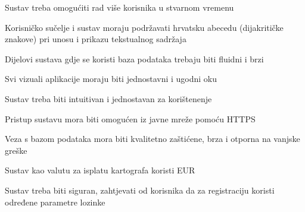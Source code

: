			 \begin{packed_item}
			 	\item Sustav treba omogućiti rad više korisnika u stvarnom vremenu
			 	\item Korisničko sučelje i sustav moraju podržavati hrvatsku abecedu (dijakritičke znakove) pri unosu i prikazu tekstualnog sadržaja
			 	\item Dijelovi sustava gdje se koristi baza podataka trebaju biti fluidni i brzi
			 	\item Svi vizuali aplikacije moraju biti jednostavni i ugodni oku
			 	\item Sustav treba biti intuitivan i jednostavan za korištenenje
			 	\item Pristup sustavu mora biti omogućen iz javne mreže pomoću HTTPS
			 	\item Veza s bazom podataka mora biti kvalitetno zaštićene, brza i otporna na vanjske greške
			 	\item Sustav kao valutu za isplatu kartografa koristi EUR
			 	\item Sustav treba biti siguran, zahtjevati od korisnika da za registraciju koristi određene parametre lozinke
			 	
			 \end{packed_item}
			 
			 
			 
	